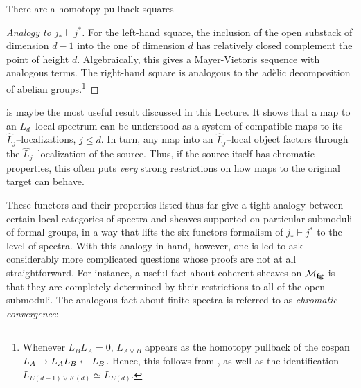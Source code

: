 \begin{corollary}\label{ChromaticFractureSquares}
There are a homotopy pullback squares
\begin{center}
\end{center}
\end{corollary}
\begin{proof}[Analogy to $j_* \vdash j^*$]
For the left-hand square, the inclusion of the open substack of dimension $d-1$ into the one of dimension $d$ has relatively closed complement the point of height $d$.  Algebraically, this gives a Mayer-Vietoris sequence with analogous terms.  The right-hand square is analogous to the ad\`elic decomposition of abelian groups.\footnote{Whenever $L_B L_A = 0$, $L_{A \vee B}$ appears as the homotopy pullback of the cospan $L_A \to L_A L_B \leftarrow L_B$.  Hence, this follows from , as well as the identification $L_{E(d-1) \vee K(d)} \simeq L_{E(d)}$.}
\end{proof}

\begin{remark}
 is maybe the most useful result discussed in this Lecture.  It shows that a map to an $L_d$--local spectrum can be understood as a system of compatible maps to its $\widehat L_j$--localizations, $j \le d$.  In turn, any map into an $\widehat L_j$--local object factors through the $\widehat L_j$--localization of the source.  Thus, if the source itself has chromatic properties, this often puts \emph{very} strong restrictions on how maps to the original target can behave.
\end{remark}

These functors and their properties listed thus far give a tight analogy between certain local categories of spectra and sheaves supported on particular submoduli of formal groups, in a way that lifts the six-functors formalism of $j_* \vdash j^*$ to the level of spectra.  With this analogy in hand, however, one is led to ask considerably more complicated questions whose proofs are not at all straightforward.  For instance, a useful fact about coherent sheaves on $\mathcal{M}_{\mathbf{fg}}$ is that they are completely determined by their restrictions to all of the open submoduli.  The analogous fact about finite spectra is referred to as \textit{chromatic convergence}:

